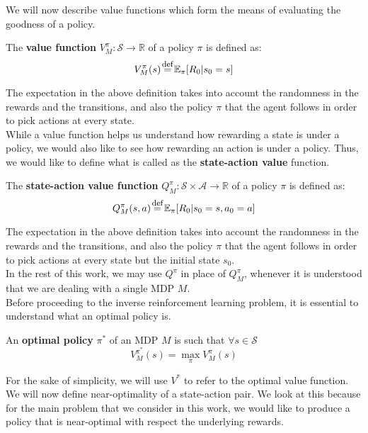 We will now describe value functions which form the means of evaluating the goodness of a policy. 




\begin{dfn}
The \textbf{value function} $V_M^{\pi}: \mathcal{S} \to \mathbb{R}$ of a policy $\pi$ is defined as:
\[
V_M^{\pi}(s) \defeq \mathbb{E}_{\pi}[R_0 | s_0 = s]
\] 
\end{dfn}


The expectation in the above definition takes into account the randomness in the rewards and the transitions, and also the policy $\pi$ that the agent follows in order to pick actions at every state. \\

While a value function helps us understand how rewarding a state is under a policy, we would also like to see how rewarding an action is under a policy. Thus, we would like to define what is called as the \textbf{state-action value} function. \\

\begin{dfn}
The \textbf{state-action value function}  $Q_M^{\pi}: \mathcal{S} \times \mathcal{A} \to \mathbb{R}$ of a policy $\pi$ is defined as:
\[
Q_M^{\pi}(s,a) \defeq \mathbb{E}_{\pi}[R_0 | s_0 = s, a_0 = a]
\] 
\end{dfn}

The expectation in the above definition takes into account the randomness in the rewards and the transitions, and also the policy $\pi$ that the agent follows in order to pick actions at every state but the initial state $s_0$. \\

In the rest of this work, we may use $Q^{\pi}$ in place of $Q^{\pi}_M$, whenever it is understood that we are dealing with a single MDP $M$.\\


Before proceeding to the inverse reinforcement learning problem, it is essential to understand what an optimal policy is.

\begin{dfn}
An \textbf{optimal policy}   $\pi^*$ of an MDP $M$ is such that $\forall s \in \mathcal{S}$
\[
V_{M}^{\pi^*}(s) = \max\limits_{\pi} V_{M}^{\pi}(s) 
\] 
\end{dfn}

For the sake of simplicity, we will use $V^{*}$ to refer to the optimal value function.  
We will now define near-optimality of a state-action pair. We look at this because for the main problem that we consider in this work, we would like to produce a policy that is near-optimal with respect the underlying rewards. 

